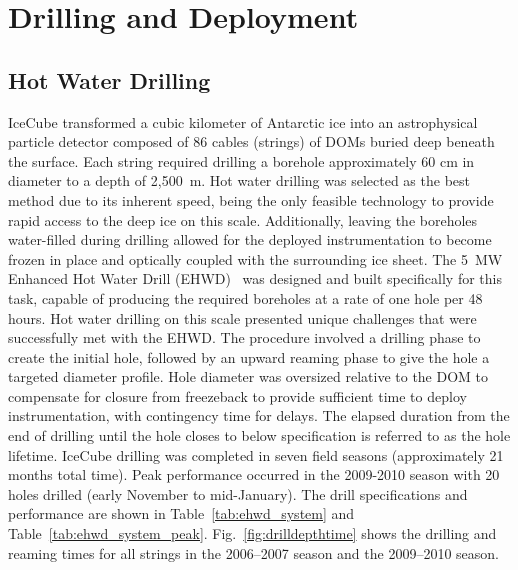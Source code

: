 
\section{Drilling and Deployment}

\subsection{\label{sec:hot_water_drilling}Hot Water Drilling}

IceCube transformed a cubic kilometer of Antarctic ice into an
astrophysical particle detector composed of 86 cables (strings) of DOMs
buried deep beneath the surface.  Each string required drilling a borehole
approximately 60 cm in diameter to a depth of 2,500~m. Hot water drilling
was selected as the best method due to its inherent speed, being the only
feasible technology to provide rapid access to the deep ice on this scale.
Additionally, leaving the boreholes water-filled during drilling allowed
for the deployed instrumentation to become frozen in place and optically
coupled with the surrounding ice sheet. The 5~MW Enhanced Hot Water Drill
(EHWD)~\cite{ehwd} was designed and built specifically for this task,
capable of producing the required boreholes at a rate of one hole per 48
hours. Hot water drilling on this scale presented unique challenges that
were successfully met with the EHWD. The procedure involved a drilling phase
to create the initial hole, followed by an upward reaming phase to give the
hole a targeted diameter profile.  Hole diameter was oversized relative to
the DOM to compensate for closure from freezeback to provide sufficient
time to deploy instrumentation, with contingency time for delays.  The
elapsed duration from the end of drilling until the hole closes to below
specification is referred to as the hole lifetime. IceCube drilling was
completed in seven field seasons (approximately 21 months total time).
Peak performance occurred in the 2009-2010 season with 20 holes drilled
(early November to mid-January).  The drill specifications and performance
are shown in Table~\ref{tab:ehwd_system} and
Table~\ref{tab:ehwd_system_peak}. Fig.~\ref{fig:drilldepthtime} shows the
drilling and reaming times for all strings in the 2006--2007 season and the
2009--2010 season.

\vspace{\baselineskip}

